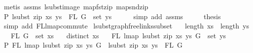 \begin{isabellebody}
\ {\isacharparenleft}{\kern0pt}metis\ assms{\isacharparenleft}{\kern0pt}{}{\isacharcomma}{\kern0pt}{}{\isacharparenright}{\kern0pt}\ lsubst{\isacharunderscore}{\kern0pt}image\ map{\isacharunderscore}{\kern0pt}fst{\isacharunderscore}{\kern0pt}zip\ map{\isacharunderscore}{\kern0pt}snd{\isacharunderscore}{\kern0pt}zip{\isacharparenright}{\kern0pt}\isanewline
\ \ \isamarkupfalse%
\ \isamarkupfalse%
\ P{}{\isacharcolon}{\kern0pt}\ {\isachardoublequoteopen}lsubst\ {\isacharparenleft}{\kern0pt}zip\ xs\ ys{\isacharparenright}{\kern0pt}\ {\isacharbackquote}{\kern0pt}\ FL\ G\ {\isacharequal}{\kern0pt}\ set\ ys{\isachardoublequoteclose}\isanewline
\ \ \ \ \isamarkupfalse%
\ {\isacharparenleft}{\kern0pt}simp\ add{\isacharcolon}{\kern0pt}\ assms{\isacharparenleft}{\kern0pt}{}{\isacharparenright}{\kern0pt}{\isacharparenright}{\kern0pt}\isanewline
\ \ \isamarkupfalse%
\ \isamarkupfalse%
\ {\isacharquery}{\kern0pt}thesis\isanewline
\ \ \ \ \isamarkupfalse%
\ {\isacharparenleft}{\kern0pt}simp\ add{\isacharcolon}{\kern0pt}\ FL{\isacharunderscore}{\kern0pt}lmap{\isacharunderscore}{\kern0pt}commute{\isacharparenright}{\kern0pt}\isanewline
{}\isamarkupfalse%
%
\endisatagproof
{\isafoldproof}%
%
\isadelimproof
\isanewline
%
\endisadelimproof
\isanewline
\isanewline
\isanewline
{}\isamarkupfalse%
\ lsubst{\isacharunderscore}{\kern0pt}graph{\isacharunderscore}{\kern0pt}freelinks{\isacharunderscore}{\kern0pt}subset{\isacharcolon}{\kern0pt}\isanewline
\ \ \ {\isachardoublequoteopen}length\ xs\ {\isacharequal}{\kern0pt}\ length\ ys{\isachardoublequoteclose}\isanewline
\ \ \ {\isachardoublequoteopen}FL\ G\ {\isasymsubseteq}\ set\ xs{\isachardoublequoteclose}\isanewline
\ \ \ {\isachardoublequoteopen}distinct\ xs{\isachardoublequoteclose}\isanewline
\ \ \ {\isachardoublequoteopen}FL\ {\isacharparenleft}{\kern0pt}lmap\ {\isacharparenleft}{\kern0pt}lsubst\ {\isacharparenleft}{\kern0pt}zip\ xs\ ys{\isacharparenright}{\kern0pt}{\isacharparenright}{\kern0pt}\ G{\isacharparenright}{\kern0pt}\ {\isasymsubseteq}\ set\ ys{\isachardoublequoteclose}\isanewline
%
\isadelimproof
%
\endisadelimproof
%
\isatagproof
{}\isamarkupfalse%
\ {\isacharminus}{\kern0pt}\isanewline
\ \ \isamarkupfalse%
\ P{}{\isacharcolon}{\kern0pt}\ {\isachardoublequoteopen}FL\ {\isacharparenleft}{\kern0pt}lmap\ {\isacharparenleft}{\kern0pt}lsubst\ {\isacharparenleft}{\kern0pt}zip\ xs\ ys{\isacharparenright}{\kern0pt}{\isacharparenright}{\kern0pt}\ G{\isacharparenright}{\kern0pt}\ {\isasymsubseteq}\ {\isacharparenleft}{\kern0pt}lsubst\ {\isacharparenleft}{\kern0pt}zip\ xs\ ys{\isacharparenright}{\kern0pt}{\isacharparenright}{\kern0pt}\ {\isacharbackquote}{\kern0pt}\ FL\ G{\isachardoublequoteclose}\isanewline

\end{isabellebody}
